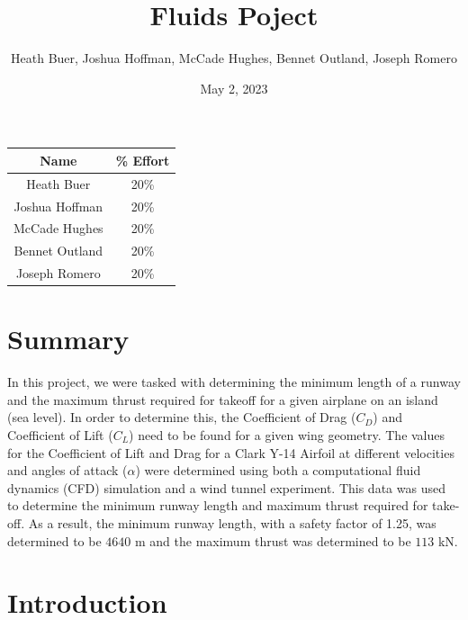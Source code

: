 \documentclass[
	12pt, %
]{fluids_report_style}
\title{Fluids Poject}        %
\author{Heath Buer, Joshua Hoffman, McCade Hughes, Bennet Outland, Joseph Romero}   %
\date{May 2, 2023}%
\institute{Department of Mechanical Engineering}              %
\begin{document}
\maketitle 
\begin{table}
    \centering
    \begin{tabular}{c|c}
        Name & \% Effort \\
        \hline
        Heath Buer & 20\% \\
        Joshua Hoffman & 20\% \\
        McCade Hughes & 20\% \\
        Bennet Outland & 20\% \\
        Joseph Romero & 20\%
    \end{tabular}
\end{table}





\newpage
{}
\tableofcontents
\newpage
{}          %


\section{Summary}
In this project, we were tasked with determining the minimum length of a runway and the maximum thrust required for takeoff for a given airplane on an island (sea level). In order to determine this, the Coefficient of Drag ($C_D$) and Coefficient of Lift ($C_L$) need to be found for a given wing geometry. The values for the Coefficient of Lift and Drag for a Clark Y-14 Airfoil at different velocities and angles of attack ($\alpha$) were determined using both a computational fluid dynamics (CFD) simulation and a wind tunnel experiment. This data was used to determine the minimum runway length and maximum thrust required for take-off. As a result, the minimum runway length, with a safety factor of 1.25, was determined to be $4640$ m and the maximum thrust was determined to be $113$ kN. 

\section{Introduction}

\end{document}
